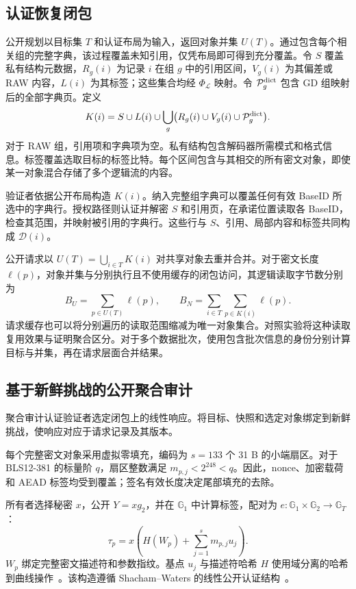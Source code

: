 \documentclass[10pt,journal]{IEEEtran}
\begin{document}
\subsection{认证恢复闭包}\label{sec:c2}
公开规划以目标集 $T$ 和认证布局为输入，返回对象并集 $U(T)$。通过包含每个相关组的完整字典，该过程覆盖未知引用，仅凭布局即可得到充分覆盖。令 $S$ 覆盖私有结构元数据，$R_g(i)$ 为记录 $i$ 在组 $g$ 中的引用区间，$V_g(i)$ 为其偏差或 RAW 内容，$L(i)$ 为其标签；这些集合均经 $\Phi_{\mathcal L}$ 映射。令 $\mathcal P_g^{\rm dict}$ 包含 GD 组映射后的全部字典页。定义
\begin{equation}\label{eq:closure}
K(i)=S\cup L(i)\cup\bigcup_g
\bigl(R_g(i)\cup V_g(i)\cup\mathcal P_g^{\rm dict}\bigr).
\end{equation}
对于 RAW 组，引用项和字典项为空。私有结构包含解码器所需模式和格式信息。标签覆盖选取目标的标签比特。每个区间包含与其相交的所有密文对象，即使某一对象混合存储了多个逻辑流的内容。

验证者依据公开布局构造 $K(i)$。纳入完整组字典可以覆盖任何有效 BaseID 所选中的字典行。授权路径则认证并解密 $S$ 和引用页，在承诺位置读取各 BaseID，检查其范围，并映射被引用的字典行。这些行与 $S$、引用、局部内容和标签共同构成 $\mathcal D(i)$。

公开请求以 $U(T)=\bigcup_{i\in T}K(i)$ 对共享对象去重并合并。对于密文长度 $\ell(p)$，对象并集与分别执行且不使用缓存的闭包访问，其逻辑读取字节数分别为
\begin{equation}\label{eq:reads}
B_U=\sum_{p\in U(T)}\ell(p),\qquad
B_N=\sum_{i\in T}\sum_{p\in K(i)}\ell(p).
\end{equation}
请求缓存也可以将分别遍历的读取范围缩减为唯一对象集合。对照实验将这种读取复用效果与证明聚合区分。对于多个数据批次，使用包含批次信息的身份分别计算目标与并集，再在请求层面合并结果。

\subsection{基于新鲜挑战的公开聚合审计}\label{sec:audit}
聚合审计认证验证者选定闭包上的线性响应。将目标、快照和选定对象绑定到新鲜挑战，使响应对应于请求记录及其版本。

每个完整密文对象采用虚拟零填充，编码为 $s=133$ 个 31 B 的小端扇区。对于 BLS12-381 的标量阶 $q$，扇区整数满足 $m_{p,j}<2^{248}<q$。因此，nonce、加密载荷和 AEAD 标签均受到覆盖；签名有效长度决定尾部填充的去除。

所有者选择秘密 $x$，公开 $Y=xg_2$，并在 $\mathbb G_1$ 中计算标签，配对为 $e:\mathbb G_1\times\mathbb G_2\to\mathbb G_T$：
\begin{equation}\label{eq:tag}
\tau_p=x\left(H(W_p)+\sum_{j=1}^{s}m_{p,j}u_j\right).
\end{equation}
$W_p$ 绑定完整密文描述符和参数指纹。基点 $u_j$ 与描述符哈希 $H$ 使用域分离的哈希到曲线操作~\cite{RFC9380}。该构造遵循 Shacham--Waters 的线性公开认证结构~\cite{ShachamWaters2013}。
\end{document}
